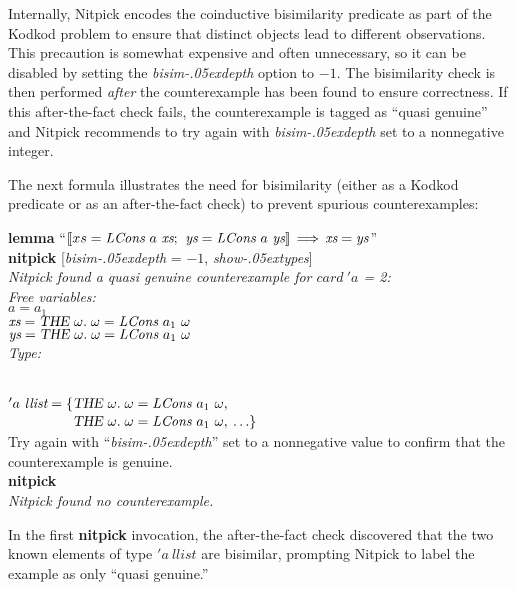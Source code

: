 \documentclass[a4paper,12pt]{article}
\def\unr{\ldots}
\renewcommand\_{\hbox{\textunderscore\kern-.05ex}}
\begin{document}
Internally, Nitpick encodes the coinductive bisimilarity predicate as part of
the Kodkod problem to ensure that distinct objects lead to different
observations. This precaution is somewhat expensive and often unnecessary, so it
can be disabled by setting the \textit{bisim\_depth} option to $-1$. The
bisimilarity check is then performed \textsl{after} the counterexample has been
found to ensure correctness. If this after-the-fact check fails, the
counterexample is tagged as ``quasi genuine'' and Nitpick recommends to try
again with \textit{bisim\_depth} set to a nonnegative integer.

The next formula illustrates the need for bisimilarity (either as a Kodkod
predicate or as an after-the-fact check) to prevent spurious counterexamples:

\prew
\textbf{lemma} ``$\mathopen{[\![} xs = \textit{LCons}~a~\textit{xs};\>\, \textit{ys} = \textit{LCons}~a~\textit{ys}\mathclose{]\!]}
\,\Longrightarrow\, \textit{xs} = \textit{ys\/}$'' \\
\textbf{nitpick} [\textit{bisim\_depth} = $-1$, \textit{show\_types}] \\[2\smallskipamount]
\slshape Nitpick found a quasi genuine counterexample for $\textit{card}~'a$ = 2: \\[2\smallskipamount]
\hbox{}\qquad Free variables: \nopagebreak \\
\hbox{}\qquad\qquad $a = a_1$ \\
\hbox{}\qquad\qquad $\textit{xs} = \textsl{THE}~\omega.\; \omega =
\textit{LCons}~a_1~\omega$ \\
\hbox{}\qquad\qquad $\textit{ys} = \textsl{THE}~\omega.\; \omega = \textit{LCons}~a_1~\omega$ \\
\hbox{}\qquad Type:\strut \nopagebreak \\
\hbox{}\qquad\qquad $'a~\textit{llist} =
\{\!\begin{aligned}[t]
  & \textsl{THE}~\omega.\; \omega = \textit{LCons}~a_1~\omega, \\[-2pt]
  & \textsl{THE}~\omega.\; \omega = \textit{LCons}~a_1~\omega,\> \unr\}\end{aligned}$
\\[2\smallskipamount]
Try again with ``\textit{bisim\_depth}'' set to a nonnegative value to confirm
that the counterexample is genuine. \\[2\smallskipamount]
{\upshape\textbf{nitpick}} \\[2\smallskipamount]
\slshape Nitpick found no counterexample.
\postw

In the first \textbf{nitpick} invocation, the after-the-fact check discovered
that the two known elements of type $'a~\textit{llist}$ are bisimilar, prompting
Nitpick to label the example as only ``quasi genuine.''
\end{document}
